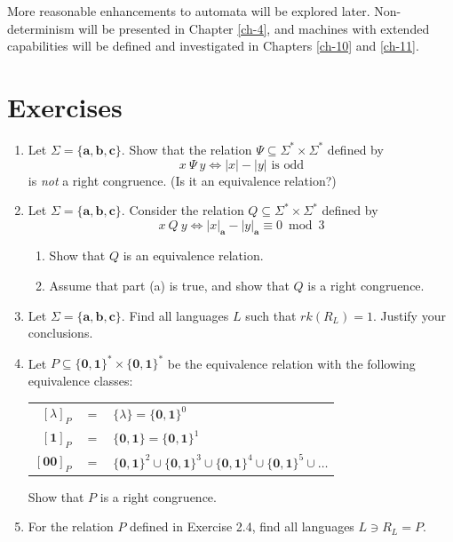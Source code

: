 More reasonable enhancements to automata will be explored later. Non-determinism
will be presented in Chapter \ref{ch-4}, and machines with extended capabilities will be
defined and investigated in Chapters \ref{ch-10} and \ref{ch-11}.

\section*{Exercises}

\begin{enumerate}[{2.}1.]
\item Let $\Sigma=\{\pmb{a},\pmb{b},\pmb{c}\}$. Show that the relation $\Psi
\subseteq \Sigma^* \times \Sigma^*$ defined by
\[ x\ \Psi\ y \Leftrightarrow |x|-|y|\text{ is odd} \]
is \emph{not} a right congruence. (Is it an equivalence relation?)

\item Let $\Sigma=\{\pmb{a},\pmb{b},\pmb{c}\}$. Consider the relation $Q
\subseteq \Sigma^* \times \Sigma^*$ defined by
\[ x\ Q\ y \Leftrightarrow |x|_{\pmb{a}} - |y|_{\pmb{a}} \equiv 0 \bmod{3} \]
\begin{enumerate}
\item Show that $Q$ is an equivalence relation.
\item Assume that part (a) is true, and show that $Q$ is a right congruence.
\end{enumerate}

\item Let $\Sigma=\{\pmb{a},\pmb{b},\pmb{c}\}$. Find all languages $L$ such that
$rk(R_L) = 1$. Justify your conclusions.

\item Let $P \subseteq \{\pmb{0},\pmb{1}\}^* \times \{\pmb{0},\pmb{1}\}^*$ be
the equivalence relation with the following equivalence classes:
\begin{center}\begin{tabular}{rcl}
$[\lambda]_P$ & $=$ & $\{\lambda\} = \{\pmb{0},\pmb{1}\}^0$ \\
$[\pmb{1}]_P$ & $=$ & $\{\pmb{0},\pmb{1}\} = \{\pmb{0},\pmb{1}\}^1$ \\
$[\pmb{00}]_P$ & $=$ & $\{\pmb{0},\pmb{1}\}^2 \cup \{\pmb{0},\pmb{1}\}^3 \cup
	\{\pmb{0},\pmb{1}\}^4 \cup \{\pmb{0},\pmb{1}\}^5 \cup \ldots$
\end{tabular}\end{center}
Show that $P$ is a right congruence.

\item For the relation $P$ defined in Exercise 2.4, find all languages $L \ni
R_L = P$.


\end{enumerate}
